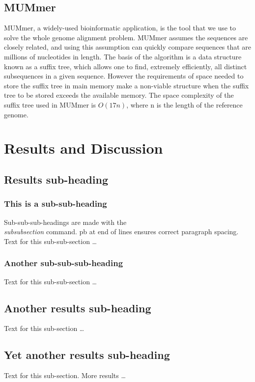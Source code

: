 \documentclass[10pt]{bmc_article}
\newenvironment{bmcformat}{\begin{raggedright}\baselineskip20pt\sloppy\setboolean{publ}{false}}{\end{raggedright}\baselineskip20pt\sloppy}
\begin{document}
\begin{bmcformat}
\subsection{MUMmer}
MUMmer, a widely-used bioinformatic application, is the tool that we use to solve the whole genome alignment problem. MUMmer assumes the sequences are closely related, and using this assumption can quickly compare sequences that are millions of nucleotides in length. The basis of the algorithm is a data structure known as a suffix tree, which allows one to find, extremely efficiently, all distinct subsequences in a given sequence. However the requirements of space needed to store the suffix tree in main memory make a non-viable structure when the suffix tree to be stored exceeds the available memory. The space complexity of the suffix tree used in MUMmer is $O(17n)$, where n is the length of the reference genome.\\

\section*{Results and Discussion}
  \subsection*{Results sub-heading}
    \subsubsection*{This is a sub-sub-heading}
      Sub-sub-sub-headings are made with the \textsl{\\subsubsection} command. \pb
      pb at end of lines ensures correct paragraph spacing.\pb
	  Text for this sub-sub-section \ldots
    \subsubsection*{Another sub-sub-sub-heading}
      Text for this sub-sub-section \ldots

  \subsection*{Another results sub-heading}
    Text for this sub-section \ldots

  \subsection*{Yet another results sub-heading}
    Text for this sub-section.  More results \ldots



\end{bmcformat}
\end{document}
